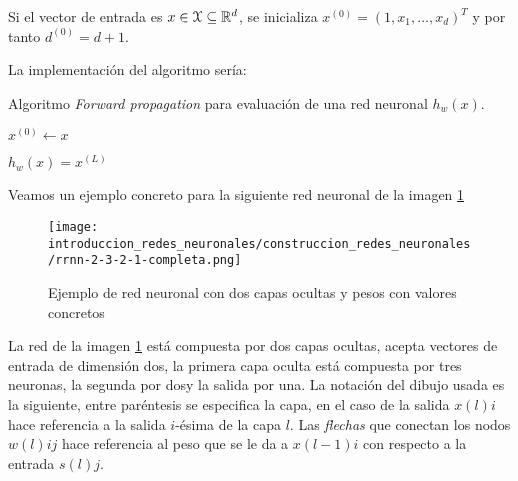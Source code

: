 Si el vector de entrada es $x \in \mathcal{X} \subseteq \mathbb{R}^d$, 
se inicializa  $x^{(0)} = (1,x_1, \ldots, x_d)^T$ y por tanto $d^{(0)} = d+1.$


La implementación del algoritmo sería:

\begin{algorithm}[H]
    \caption{Algoritmo \textit{Forward propagation} para evaluación de una red neuronal $h_w(x)$.}
    \begin{algorithmic}[1]
        \STATE $x^{(0)} \leftarrow x$ 

        \STATE {}
        \STATE $h_w(x) = x^{(L)}$ 
\end{algorithmic}
\end{algorithm}

Veamos un ejemplo concreto para la siguiente red neuronal de la imagen \ref{img:construccion_rrnn:rrnn-2-3-2-1}
\begin{figure}[h!]
    \texttt{[image: introduccion\_redes\_neuronales/construccion\_redes\_neuronales/rrnn-2-3-2-1-completa.png]}
    \caption{Ejemplo de red neuronal con dos capas ocultas y pesos con valores concretos}
    \label{img:construccion_rrnn:rrnn-2-3-2-1}
\end{figure} 

La red de la imagen \ref{img:construccion_rrnn:rrnn-2-3-2-1} está 
compuesta por dos capas ocultas, acepta vectores de entrada de dimensión dos, 
la primera capa oculta está compuesta por tres neuronas, 
la segunda por dosy la salida por una. 
La notación del dibujo usada es la siguiente, entre paréntesis se 
especifica la capa, en el caso de la salida $x(l)i$ hace referencia a la salida $i$-ésima de la capa $l$. Las \textit{flechas} que conectan los nodos $w(l)ij$ hace referencia al peso que se le da a $x(l-1)i$ con respecto a la entrada $s(l)j$.

